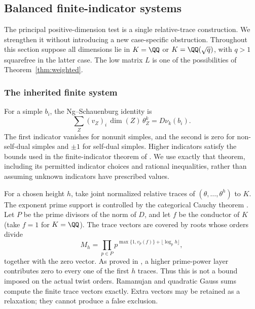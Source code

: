 \subsection{Balanced finite-indicator systems}\label{sec:balanced}
The principal positive-dimension test is a single relative-trace
construction. We strengthen it without introducing a new case-specific
obstruction. Throughout this section suppose all dimensions lie in
$K=\QQ$ or $K=\QQ(\sqrt q)$, with $q>1$ squarefree in the latter case.
The low matrix $L$ is one of the possibilities of
Theorem~\ref{thm:weighted}.

\subsubsection{The inherited finite system}
For a simple $b_i$, the Ng--Schauenburg identity \cite{NS} is
\begin{equation}\label{eq:indicator}
 \sum_Z (v_Z)_i\,\dim(Z)\,\theta_Z^k=D\nu_k(b_i).
\end{equation}
The first indicator vanishes for nonunit simples, and the second is zero
for non-self-dual simples and $\pm1$ for self-dual simples. Higher
indicators satisfy the bounds used in the finite-indicator theorem of
\cite{DP5}. We use exactly that theorem, including its permitted
indicator choices and rational inequalities, rather than assuming
unknown indicators have prescribed values.

For a chosen height $h$, take joint normalized relative traces of
$(\theta,\ldots,\theta^h)$ to $K$. The exponent prime support is
controlled by the categorical Cauchy theorem \cite{BNRW}. Let $P$ be
the prime divisors of the norm of $D$, and let $f$ be the conductor of
$K$ (take $f=1$ for $K=\QQ$). The trace vectors are covered by roots
whose orders divide
\begin{equation}\label{eq:orderbox}
 M_h=\prod_{p\in P}p^{\max\{1,v_p(f)\}+\lfloor\log_p h\rfloor},
\end{equation}
together with the zero vector. As proved in \cite{DP5}, a higher
prime-power layer contributes zero to every one of the first $h$
traces. Thus this is not a bound imposed on the actual twist orders.
Ramanujan and quadratic Gauss sums compute the finite trace vectors
exactly. Extra vectors may be retained as a relaxation; they cannot
produce a false exclusion.

